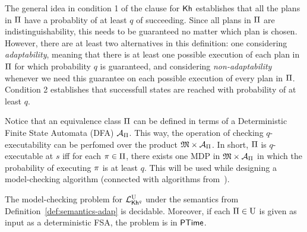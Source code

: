 The general idea in condition 1 of the clause for ${\mathsf{Kh}}$ establishes that all the plans in $\Pi$ have a probablity of at least $q$ of succeeding. Since all plans in $\Pi$ are indistinguishability, this needs to be guaranteed no matter which plan is chosen. However, there are at least two alternatives in this definition: one considering \emph{adaptability}, meaning that there is at least one possible execution of each plan in $\Pi$ for which probability $q$ is guaranteed, and considering \emph{non-adaptability} whenever we need this guarantee on each possible execution of every plan in $\Pi$. Condition 2 establishes that successfull states are reached with probability of at least $q$.

\begin{remark}
    Notice that an equivalence class $\Pi$ can be defined in terms of a Deterministic Finite State Automata (DFA) $\mathcal{A}_{\Pi}$. This way, the operation of checking $q$-executability can be perfomed over the product $\mathfrak{M}\times\mathcal{A}_{\Pi}$. In short, $\Pi$ is $q$-executable at $s$ iff for each $\pi\in\Pi$, there exists one MDP in  $\mathfrak{M}\times\mathcal{A}_{\Pi}$ in which the probability of executing $\pi$ is at least $q$. This will be used while designing a model-checking algorithm (connected with algorithms from~\cite{AFSVQ21,AFSVQ23,DF23}).
\end{remark}

\begin{theorem}\label{th:mc-khp-adapt-decidable}
    The model-checking problem for $\mathcal{L}^{\mathrm{U}}_{{\mathsf{Kh}}^q}$ under the semantics from Definition~\ref{def:semantics-adap} is decidable. Moreover, if each $\Pi\in\operatorname{U}$ is given as input as a deterministic FSA, the problem is in ${\rm\textsf{PTime}}$.
\end{theorem}
